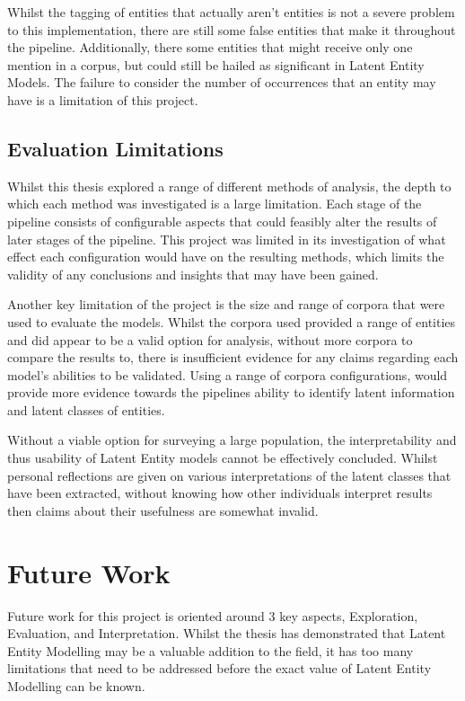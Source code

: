 \documentclass[10pt]{report}
\begin{document}
Whilst the tagging of entities that actually aren't entities is not a severe problem to this implementation, there are still some false entities that make it throughout the pipeline. Additionally, there some entities that might receive only one mention in a corpus, but could still be hailed as significant in Latent Entity Models. The failure to consider the number of occurrences that an entity may have is a limitation of this project.

\subsection{Evaluation Limitations}
Whilst this thesis explored a range of different methods of analysis, the depth to which each method was investigated is a large limitation. Each stage of the pipeline consists of configurable aspects that could feasibly alter the results of later stages of the pipeline. This project was limited in its investigation of what effect each configuration would have on the resulting methods, which limits the validity of any conclusions and insights that may have been gained.

Another key limitation of the project is the size and range of corpora that were used to evaluate the models. Whilst the corpora used provided a range of entities and did appear to be a valid option for analysis, without more corpora to compare the results to, there is insufficient evidence for any claims regarding each model's abilities to be validated. Using a range of corpora configurations, would provide more evidence towards the pipelines ability to identify latent information and latent classes of entities.

Without a viable option for surveying a large population, the interpretability and thus usability of Latent Entity models cannot be effectively concluded. Whilst personal reflections are given on various interpretations of the latent classes that have been extracted, without knowing how other individuals interpret results then claims about their usefulness are somewhat invalid.

\section{Future Work}

Future work for this project is oriented around 3 key aspects, Exploration, Evaluation, and Interpretation. Whilst the thesis has demonstrated that Latent Entity Modelling may be a valuable addition to the field, it has too many limitations that need to be addressed before the exact value of Latent Entity Modelling can be known.
\end{document}
